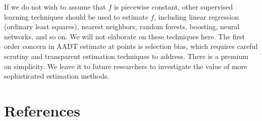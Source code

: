 \documentclass[11pt]{article}
\begin{document}
If we do not wish to assume that \(f\) is piecewise constant, other
supervised learning techniques should be used to estimate \(f\),
including linear regression (ordinary least squares), nearest neighbors,
random forests, boosting, neural networks, and so on. We will not
elaborate on these techniques here. The first order concern in AADT
estimate at points is selection bias, which requires careful scrutiny
and transparent estimation techniques to address. There is a premium on
simplicity. We leave it to future researchers to investigate the value
of more sophisticated estimation methods.

    \section{References}\label{references}
\end{document}
